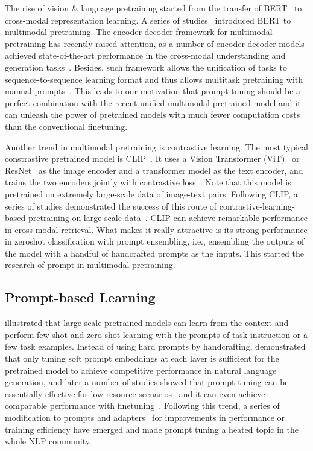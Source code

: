 \documentclass[11pt]{article}
\begin{document}
The rise of vision \& language pretraining started from the transfer of BERT~\citep{bert} to cross-modal representation learning. A series of studies~\citep{vilbert, vl-bert, lxmert, uniter, unicoder-vl} introduced BERT to multimodal pretraining. 
The encoder-decoder framework for multimodal pretraining has recently raised attention, as a number of encoder-decoder models achieved state-of-the-art performance in the cross-modal understanding and generation tasks~\citep{simvlm, ofa, coca}. 
Besides, such framework allows the unification of tasks to sequence-to-sequence learning format and thus allows multitask pretraining with manual prompts~\citep{vlt5, ofa}. 
This leads to our motivation that prompt tuning should be a perfect combination with the recent unified multimodal pretrained model and it can unleash the power of pretrained models with much fewer computation costs than the conventional finetuning. 

Another trend in multimodal pretraining is contrastive learning. 
The most typical constrastive pretrained model is CLIP~\citep{clip}. 
It uses a Vision Transformer (ViT)~\citep{vit} or ResNet~\citep{resnet, tan2019efficientnet} as the image encoder and a transformer model as the text encoder, and trains the two encoders jointly with contrastive loss~\citep{infonce}. 
Note that this model is pretrained on extremely large-scale data of image-text pairs. 
Following CLIP, a series of studies demonstrated the success of this route of contrastive-learning-based pretraining on large-scale data~\citep{align, filip}. 
CLIP can achieve remarkable performance in cross-modal retrieval. What makes it really attractive is its strong performance in zeroshot classification with prompt ensembling, i.e., ensembling the outputs of the model with a handful of handcrafted prompts as the inputs. 
This started the research of prompt in multimodal pretraining. 


\subsection{Prompt-based Learning}


\citet{gpt3} illustrated that large-scale pretrained models can learn from the context and perform few-shot and zero-shot learning with the prompts of  task instruction or a few task examples. 
Instead of using hard prompts by handcrafting, \citet{prefix_tuning} demonstrated that only tuning soft prompt embeddings at each layer is sufficient for the pretrained model to achieve competitive performance in natural language generation, and later a number of studies showed that prompt tuning can be essentially effective for low-resource scenarios~\citep{p_tuning, ppt, black_box} and it can even achieve comparable performance with finetuning~\citep{prompt_tuning, p_tuning_v2}. 
Following this trend, a series of modification to prompts and adapters~\citep{know_prompt, unified_view,ipt,bbtv2} for improvements in performance or training efficiency have emerged and made prompt tuning a heated topic in the whole NLP community. 
\end{document}
